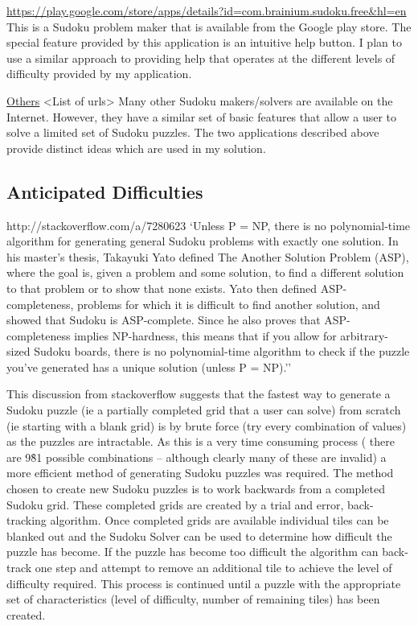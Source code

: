 \documentclass[fleqn]{article}
\begin{document}
\url{https://play.google.com/store/apps/details?id=com.brainium.sudoku.free&hl=en}
This is a Sudoku problem maker that is available from the Google play store. The special feature provided by this application is an intuitive help button. I plan to use a similar approach to providing help that operates at the different levels of difficulty provided by my application.

\url{Others}
<List of urls>
Many other Sudoku makers/solvers are available on the Internet. However, they have a similar set of basic features that allow a user to solve a limited set of Sudoku puzzles. The two applications described above provide distinct ideas which are used in my solution.


\subsection{Anticipated Difficulties}

http://stackoverflow.com/a/7280623
‘Unless P = NP, there is no polynomial-time algorithm for generating general Sudoku problems with exactly one solution.
In his master's thesis, Takayuki Yato defined The Another Solution Problem (ASP), where the goal is, given a problem and some solution, to find a different solution to that problem or to show that none exists. Yato then defined ASP-completeness, problems for which it is difficult to find another solution, and showed that Sudoku is ASP-complete. Since he also proves that ASP-completeness implies NP-hardness, this means that if you allow for arbitrary-sized Sudoku boards, there is no polynomial-time algorithm to check if the puzzle you've generated has a unique solution (unless P = NP).’’

This discussion from stackoverflow suggests that the fastest way to generate a Sudoku puzzle (ie a partially completed grid that a user can solve) from scratch (ie starting with a blank grid) is by brute force (try every combination of values) as the puzzles are intractable. As this is a very time consuming process ( there are 9\^81 possible combinations – although clearly many of these are invalid) a more efficient method of generating Sudoku puzzles was required.
The method chosen to create new Sudoku puzzles is to work backwards from a completed Sudoku grid. These completed grids are created by a trial and error, back-tracking algorithm. Once completed grids are available individual tiles can be blanked out and the Sudoku Solver can be used to determine how difficult the puzzle has become. If the puzzle has become too difficult the algorithm can back-track one step and attempt to remove an additional tile to achieve the level of difficulty required. This process is continued until a puzzle with the appropriate set of characteristics (level of difficulty, number of remaining tiles) has been created.
\end{document}
